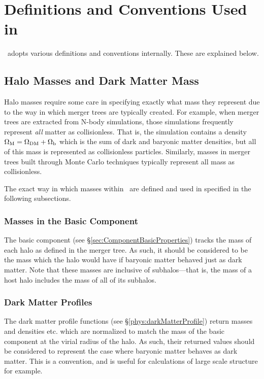 \chapter{Definitions and Conventions Used in \glc}

\glc\ adopts various definitions and conventions internally. These are explained below.

\section{Halo Masses and Dark Matter Mass}

Halo masses require some care in specifying exactly what mass they represent due to the way in which merger trees are typically created. For example, when merger trees are extracted from N-body simulations, those simulations frequently represent \emph{all} matter as collisionless. That is, the simulation contains a density $\Omega_{\rm M}=\Omega_{\rm DM}+\Omega_{\rm b}$ which is the sum of dark and baryonic matter densities, but all of this mass is represented as collisionless particles. Similarly, masses in merger trees built through Monte Carlo techniques typically represent all mass as collisionless.

The exact way in which masses within \glc\ are defined and used in specified in the following subsections.

\subsection{Masses in the Basic Component}

The {\normalfont \ttfamily basic} component (see \S\ref{sec:ComponentBasicProperties}) tracks the mass of each halo as defined in the merger tree. As such, it should be considered to be the mass which the halo would have if baryonic matter behaved just as dark matter. Note that these masses are inclusive of subhalos---that is, the mass of a host halo includes the mass of all of its subhalos.

\subsection{Dark Matter Profiles}

The dark matter profile functions (see \S\ref{phys:darkMatterProfile}) return masses and densities etc. which are normalized to match the mass of the {\normalfont \ttfamily basic} component at the virial radius of the halo. As such, their returned values should be considered to represent the case where baryonic matter behaves as dark matter. This is a convention, and is useful for calculations of large scale structure for example.

